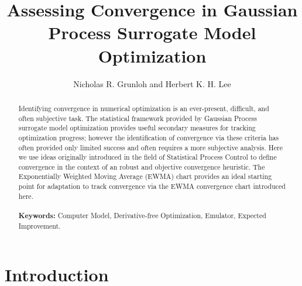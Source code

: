 \documentclass[12pt]{article}
\begin{document}
% 
%
\title{Assessing Convergence in Gaussian Process Surrogate Model Optimization}
\author{Nicholas R. Grunloh and Herbert K. H. Lee}
\date{}
\maketitle
%
%

%
\begin{abstract}
Identifying convergence in numerical optimization is an ever-present, difficult, and often subjective task. 
The statistical framework provided by Gaussian Process surrogate model optimization provides useful secondary measures for tracking optimization progress; however the identification of convergence via these criteria has often provided only limited success and often requires a more subjective analysis. %
Here we use ideas originally introduced in the field of Statistical Process Control to define convergence in the context of an robust and objective convergence heuristic. 
The Exponentially Weighted Moving Average (EWMA) chart provides an ideal starting point for adaptation to track convergence via the EWMA convergence chart introduced here.
\\\\
{\bf \color{red}Keywords:} Computer Model, Derivative-free Optimization, Emulator, Expected Improvement.
\end{abstract}
 
\doublespacing
%
%

%
%
\section{Introduction}
%
%
\end{document}
